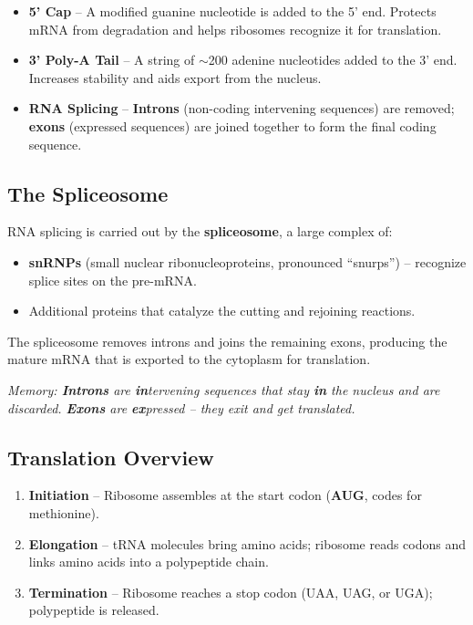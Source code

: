 \documentclass[11pt, letterpaper]{article}
\begin{document}
\begin{tcolorbox}[colback=part2bg, colframe=sectiongreen, arc=3pt, boxrule=1pt]
\begin{itemize}[noitemsep, leftmargin=*]
  \item \textbf{5' Cap} -- A modified guanine nucleotide is added to the 5' end. Protects mRNA from degradation and helps ribosomes recognize it for translation.
  \item \textbf{3' Poly-A Tail} -- A string of $\sim$200 adenine nucleotides added to the 3' end. Increases stability and aids export from the nucleus.
  \item \textbf{RNA Splicing} -- \textbf{Introns} (non-coding intervening sequences) are removed; \textbf{exons} (expressed sequences) are joined together to form the final coding sequence.
\end{itemize}
\end{tcolorbox}

\subsection*{The Spliceosome}
RNA splicing is carried out by the \textbf{spliceosome}, a large complex of:
\begin{itemize}[noitemsep]
  \item \textbf{snRNPs} (small nuclear ribonucleoproteins, pronounced ``snurps'') -- recognize splice sites on the pre-mRNA.
  \item Additional proteins that catalyze the cutting and rejoining reactions.
\end{itemize}
The spliceosome removes introns and joins the remaining exons, producing the mature mRNA that is exported to the cytoplasm for translation.

\vspace{4pt}
\textit{Memory: \textbf{Introns} are \textbf{in}tervening sequences that stay \textbf{in} the nucleus and are discarded. \textbf{Exons} are \textbf{ex}pressed -- they exit and get translated.}

\subsection*{Translation Overview}
\begin{enumerate}[noitemsep]
  \item \textbf{Initiation} -- Ribosome assembles at the start codon (\textbf{AUG}, codes for methionine).
  \item \textbf{Elongation} -- tRNA molecules bring amino acids; ribosome reads codons and links amino acids into a polypeptide chain.
  \item \textbf{Termination} -- Ribosome reaches a stop codon (UAA, UAG, or UGA); polypeptide is released.
\end{enumerate}
\end{document}
